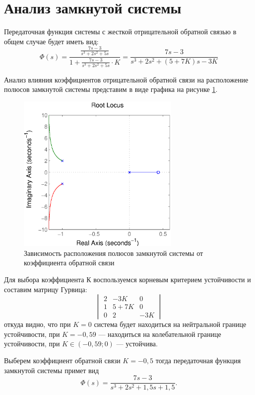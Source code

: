 \documentclass[12pt,a4paper]{article}
\begin{document}
\section{Анализ замкнутой системы}
Передаточная функция системы с жесткой отрицательной обратной связью в общем случае будет иметь вид:
\begin{equation}
\Phi(s) = \frac{\displaystyle{\frac{7s - 3}{s^3 + 2s^2 + 5s}}}{1 + \displaystyle{\frac{7s - 3}{s^3 + 2s^2 + 5s}}\cdot K} = \frac{7s - 3}{s^3 + 2s^2 + (5 + 7K)s - 3K}
\end{equation}\par
Анализ влияния коэффициентов отрицательной обратной связи на расположение полюсов замкнутой системы представим в виде графика на рисунке \ref{rlocus}.
\begin{figure}[H]
	\centering
	\includegraphics[width = 0.7\textwidth]{rlocus}
	\caption{Зависимость расположения полюсов замкнутой системы от коэффициента обратной связи}
	\label{rlocus}
\end{figure}
Для выбора коэффициента К воспользуемся корневым критерием устойчивости и составим матрицу Гурвица:
\[
\begin{vmatrix}
2 & -3K & 0\\
1 & 5+7K & 0\\
0 & 2 & -3K
\end{vmatrix}
\]
откуда видно, что при $K = 0$ система будет находиться на нейтральной границе устойчивости, при $K = -0,59$ --- находиться на колебательной границе устойчивости, при $K \in (-0,59;0)$ --- устойчива.
	
Выберем коэффициент обратной связи $K = -0,5$ тогда передаточная функция замкнутой системы примет вид
\begin{equation}
\Phi(s) = \frac{7s - 3}{s^3 + 2s^2 + 1,5s + 1,5}.
\end{equation}
\end{document}
